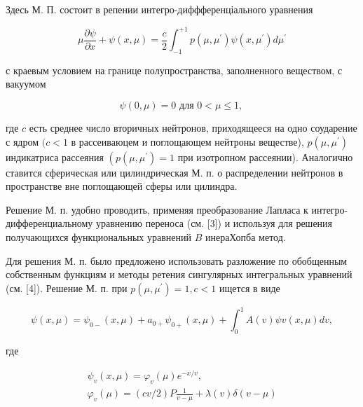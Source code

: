 \documentclass[10pt]{article}
\begin{document}
Здесь М. П. состоит в репении интегро-диффференціального уравнения



\[

\mu \frac{\partial \psi}{\partial x}+\psi(x, \mu)=\frac{c}{2} \int_{-1}^{+1} p\left(\mu, \mu^{\prime}\right) \psi\left(x, \mu^{\prime}\right) d \mu^{\prime}

\]



с краевым условием на границе полупространства, заполненного веществом, с вакуумом



\[

\psi(0, \mu)=0 \text { для } 0<\mu \leqslant 1 \text {, }

\]



где $c$ есть среднее число вторичных нейтронов, приходящееся на одно соударение с ядром $(c<1$ в рассеиваюцем и поглощающем нейтроны веществе), $p\left(\mu, \mu^{\prime}\right)$ индикатриса рассеяния $\left(p\left(\mu, \mu^{\prime}\right)=1\right.$ при изотропном рассеянии). Аналогично ставится сферическая или цилиндрическая М. п. о распределении нейтронов в пространстве вне поглощающей сферы или цилиндра.



Решение М. п. удобно проводить, применяя преобразование Лапласа к интегро-дифференциальному уравнению переноса (см. [3]) и используя для решения получающихся функциональных уравнений $B$ инераХопба метод.



Для решения М. п. было предложено использовать разложение по обобщенным собственным функциям и методы ретения сингулярных интегральных уравнений (см. [4]). Решение М. п. при $p\left(\mu, \mu^{\prime}\right)=1, c<1$ ищется в виде



\[

\psi(x, \mu)=\psi_{0-}(x, \mu)+a_{0+} \psi_{0+}(x, \mu)+\int_{0}^{1} A(v) \psi v(x, \mu) d v,

\]



где



\[

\begin{gathered}

\psi_{v}(x, \mu)=\varphi_{v}(\mu) e^{-x / v}, \\

\varphi_{v}(\mu)=(c v / 2) P \frac{1}{v-\mu}+\lambda(v) \delta(v-\mu)

\end{gathered}

\]
\end{document}
